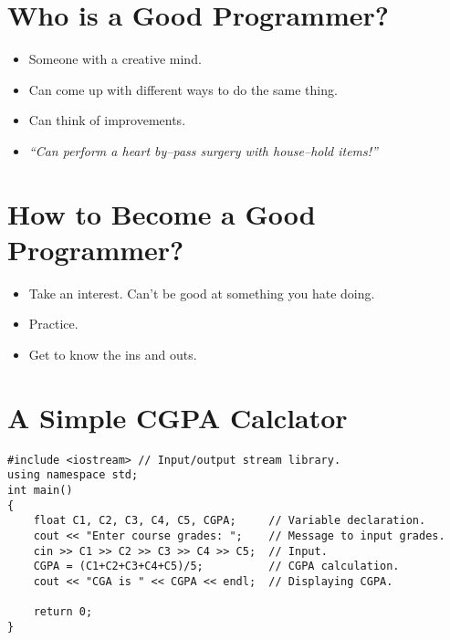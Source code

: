 \documentclass[12pt,a4paper]{article}
\begin{document}
\section{Who is a Good Programmer?}
\begin{itemize}
\item Someone with a creative mind.
\item Can come up with different ways to do the same thing.
\item Can think of improvements.
\item \textit{``Can perform a heart by--pass surgery with house--hold items!''}
\end{itemize}
\section{How to Become a Good Programmer?}
\begin{itemize}
\item Take an interest. Can't be good at something you hate doing.
\item Practice.
\item Get to know the ins and outs.
\end{itemize}
\section{A Simple CGPA Calclator}
\begin{lstlisting}[caption={CGPA Calculator}]
#include <iostream> // Input/output stream library.
using namespace std;
int main()
{
	float C1, C2, C3, C4, C5, CGPA;		// Variable declaration.
	cout << "Enter course grades: ";	// Message to input grades.
	cin >> C1 >> C2 >> C3 >> C4 >> C5;	// Input.
	CGPA = (C1+C2+C3+C4+C5)/5;			// CGPA calculation.
	cout << "CGA is " << CGPA << endl;	// Displaying CGPA.
	
	return 0;
}
\end{lstlisting}
\end{document}
